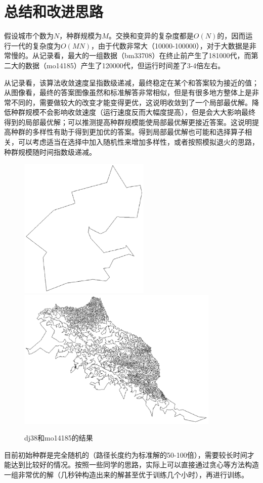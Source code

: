 \documentclass[a4paper]{ctexart}
\begin{document}
\section{总结和改进思路}
假设城市个数为$N$，种群规模为$M$。交换和变异的复杂度都是$O(N)$的，因而运行一代的复杂度为$O(MN)$，由于代数非常大（10000-100000），对于大数据是非常慢的。从记录看，最大的一组数据（bm33708）在终止前产生了181000代，而第二大的数据（mo14185）产生了120000代，但运行时间差了3-4倍左右。\par
从记录看，该算法收敛速度呈指数级递减，最终稳定在某个和答案较为接近的值；从图像看，最终的答案图像虽然和标准解答非常相似，但是有很多地方整体上是非常不同的，需要做较大的改变才能变得更优，这说明收敛到了一个局部最优解。降低种群规模不会影响收敛速度（运行速度反而大幅度提高），但是会大大影响最终得到的局部最优解；可以推测提高种群规模能使局部最优解更接近答案。这说明提高种群的多样性有助于得到更加优的答案。得到局部最优解也可能和选择算子相关，可以考虑适当在选择中加入随机性来增加多样性，或者按照模拟退火的思路，种群规模随时间指数级递减。\par
\begin{figure}[htbp]
\includegraphics[height=2.65in]{2}
\includegraphics[height=2.65in]{3}
\caption{dj38和mo14185的结果}
\end{figure}
目前初始种群是完全随机的（路径长度约为标准解的50-100倍），需要较长时间才能达到比较好的情况。按照一些同学的思路，实际上可以直接通过贪心等方法构造一组非常优的解（几秒钟构造出来的解甚至优于训练几个小时），再进行训练。\par
\end{document}
